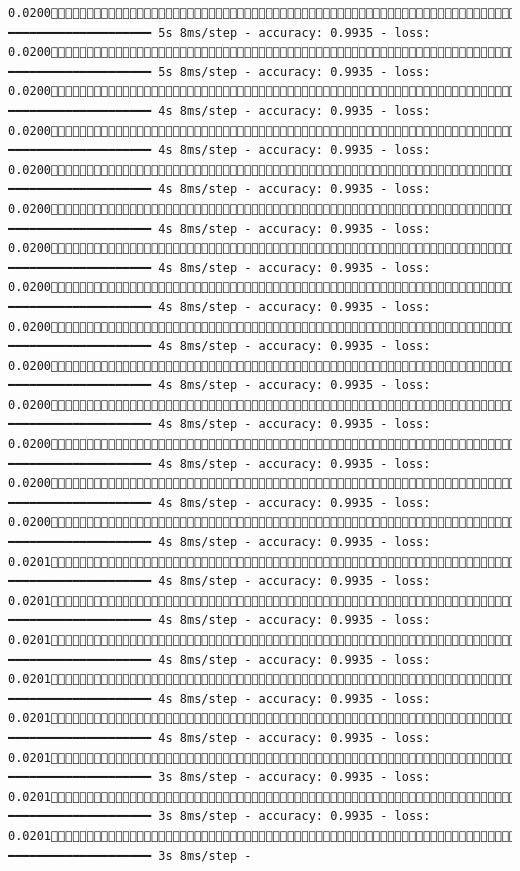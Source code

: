 \documentclass[
  letterpaper,
  DIV=11,
  numbers=noendperiod]{scrreprt}
\begin{document}
\begin{verbatim}
0.02001215/1875 ━━━━━━━━━━━━━━━━━━━━ 5s 8ms/step - accuracy: 0.9935 - loss: 0.02001222/1875 ━━━━━━━━━━━━━━━━━━━━ 5s 8ms/step - accuracy: 0.9935 - loss: 0.02001230/1875 ━━━━━━━━━━━━━━━━━━━━ 4s 8ms/step - accuracy: 0.9935 - loss: 0.02001237/1875 ━━━━━━━━━━━━━━━━━━━━ 4s 8ms/step - accuracy: 0.9935 - loss: 0.02001244/1875 ━━━━━━━━━━━━━━━━━━━━ 4s 8ms/step - accuracy: 0.9935 - loss: 0.02001251/1875 ━━━━━━━━━━━━━━━━━━━━ 4s 8ms/step - accuracy: 0.9935 - loss: 0.02001259/1875 ━━━━━━━━━━━━━━━━━━━━ 4s 8ms/step - accuracy: 0.9935 - loss: 0.02001266/1875 ━━━━━━━━━━━━━━━━━━━━ 4s 8ms/step - accuracy: 0.9935 - loss: 0.02001273/1875 ━━━━━━━━━━━━━━━━━━━━ 4s 8ms/step - accuracy: 0.9935 - loss: 0.02001280/1875 ━━━━━━━━━━━━━━━━━━━━ 4s 8ms/step - accuracy: 0.9935 - loss: 0.02001288/1875 ━━━━━━━━━━━━━━━━━━━━ 4s 8ms/step - accuracy: 0.9935 - loss: 0.02001296/1875 ━━━━━━━━━━━━━━━━━━━━ 4s 8ms/step - accuracy: 0.9935 - loss: 0.02001304/1875 ━━━━━━━━━━━━━━━━━━━━ 4s 8ms/step - accuracy: 0.9935 - loss: 0.02001312/1875 ━━━━━━━━━━━━━━━━━━━━ 4s 8ms/step - accuracy: 0.9935 - loss: 0.02011319/1875 ━━━━━━━━━━━━━━━━━━━━ 4s 8ms/step - accuracy: 0.9935 - loss: 0.02011327/1875 ━━━━━━━━━━━━━━━━━━━━ 4s 8ms/step - accuracy: 0.9935 - loss: 0.02011335/1875 ━━━━━━━━━━━━━━━━━━━━ 4s 8ms/step - accuracy: 0.9935 - loss: 0.02011343/1875 ━━━━━━━━━━━━━━━━━━━━ 4s 8ms/step - accuracy: 0.9935 - loss: 0.02011351/1875 ━━━━━━━━━━━━━━━━━━━━ 4s 8ms/step - accuracy: 0.9935 - loss: 0.02011358/1875 ━━━━━━━━━━━━━━━━━━━━ 3s 8ms/step - accuracy: 0.9935 - loss: 0.02011365/1875 ━━━━━━━━━━━━━━━━━━━━ 3s 8ms/step - accuracy: 0.9935 - loss: 0.02011372/1875 ━━━━━━━━━━━━━━━━━━━━ 3s 8ms/step - 
\end{verbatim}
\end{document}
